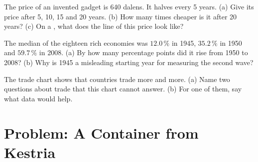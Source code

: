 \begin{exercise}[$\star\star\star$]\label{exo:g6:a-connected-world:10}
The price of an invented gadget is 640 dalens. It halves every 5 years. (a) Give its
price after 5, 10, 15 and 20 years. (b) How many times cheaper is it after 20 years?
(c) On a , what does the line of this price look like?
\end{exercise}

\begin{exercise}[$\star\star\star$]\label{exo:g6:a-connected-world:11}
The median  of the eighteen rich economies was $12.0\,\%$ in 1945,
$35.2\,\%$ in 1950 and $59.7\,\%$ in 2008. (a) By how many percentage points did it
rise from 1950 to 2008? (b) Why is 1945 a misleading starting year for measuring
the second wave?
\end{exercise}

\begin{exercise}[$\star\star\star$]\label{exo:g6:a-connected-world:12}
The trade chart shows that countries trade more and more. (a) Name two questions
about trade that this chart cannot answer. (b) For one of them, say what data
would help.
\end{exercise}

\section{Problem: A Container from Kestria}

